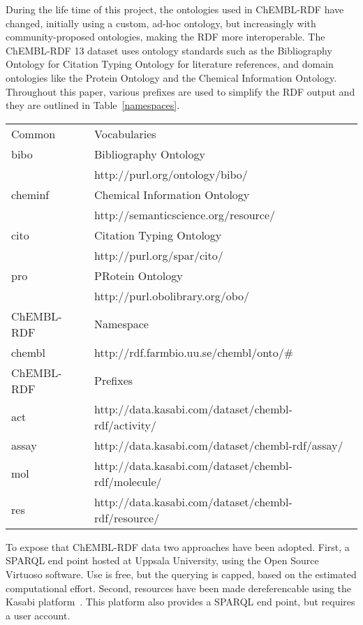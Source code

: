 \documentclass[sw]{iosart2c}
\begin{document}
During the life time of this project, the ontologies used in ChEMBL-RDF have changed,
initially using a custom, ad-hoc ontology, but increasingly with community-proposed
ontologies, making the RDF more interoperable. The ChEMBL-RDF 13 dataset uses ontology
standards such as the Bibliography Ontology for Citation Typing Ontology for literature
references, and domain ontologies like the Protein Ontology and the Chemical Information
Ontology. Throughout this paper, various prefixes are used to simplify the RDF output and they are outlined
in Table~\ref{namespaces}.

\begin{table*}
\caption{Prefixes and their matching namespaces used in this paper.} \label{namespaces}
\begin{tabular}{ll}
\hline
Common & Vocabularies \\
bibo    & Bibliography Ontology~\cite{Giasson2011} \\
        & http://purl.org/ontology/bibo/ \\
cheminf & Chemical Information Ontology~\cite{Hastings2011} \\
        & http://semanticscience.org/resource/ \\
cito    & Citation Typing Ontology~\cite{Shotton2010} \\
        & http://purl.org/spar/cito/ \\
pro     & PRotein Ontology~\cite{Sidhu2006} \\
        & http://purl.obolibrary.org/obo/ \\

\hline
ChEMBL-RDF & Namespace\\
\hline
chembl & http://rdf.farmbio.uu.se/chembl/onto/\# \\
\hline
ChEMBL-RDF & Prefixes\\
\hline
act    & http://data.kasabi.com/dataset/chembl-rdf/activity/ \\
assay  & http://data.kasabi.com/dataset/chembl-rdf/assay/ \\
mol    & http://data.kasabi.com/dataset/chembl-rdf/molecule/ \\
res    & http://data.kasabi.com/dataset/chembl-rdf/resource/ \\
\hline
\end{tabular}
\end{table*}

To expose that ChEMBL-RDF data two approaches have been adopted. First, a SPARQL end point
hosted at Uppsala University, using the Open Source Virtuoso software. Use is free, but the
querying is capped, based on the estimated computational effort. Second, resources have
been made dereferencable using the Kasabi platform~\cite{kasabi}. This platform also provides a SPARQL
end point, but requires a user account.
\end{document}
